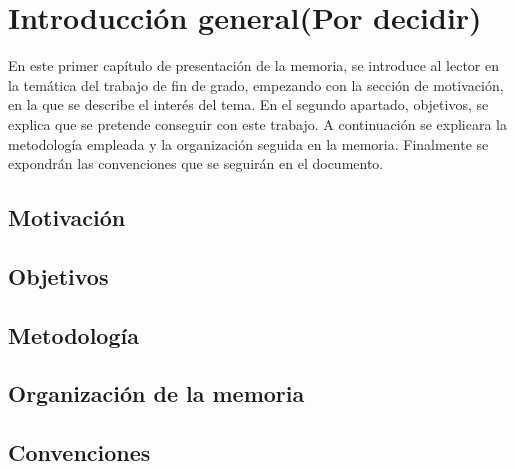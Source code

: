 
\chapter{Introducción general(Por decidir)\label{chapIntroduccion}}

En este primer capítulo de presentación de la memoria, se 
introduce al lector en la temática del trabajo de fin de grado, empezando con la sección de 
motivación, en la que se des\-cri\-be el interés del tema. En el segundo 
apartado, objetivos, se explica que se pretende conseguir con este trabajo. A continuación se explicara la metodología empleada y la organización seguida en la memoria. Finalmente se expondrán las convenciones que se seguirán en el documento.

\section{Motivación}

\section{Objetivos}

\section{Metodología}

\section{Organización de la memoria}


\section{Convenciones}
